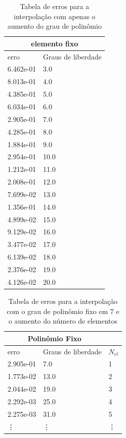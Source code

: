 \begin{table}[]
\centering
\caption{Tabela de erros para a interpolação com apenas o aumento do grau de polinômio}
\label{my-label}
\begin{tabular}{|l|l|}
\hline
\multicolumn{2}{|c|}{elemento fixo} \\
\hline
erro        & Graus de liberdade   \\
6.462e-01   & 3.0                  \\
8.013e-01   & 4.0                  \\
4.385e-01   & 5.0                  \\
6.034e-01   & 6.0                  \\
2.905e-01   & 7.0                  \\
4.285e-01   & 8.0                  \\
1.884e-01   & 9.0                  \\
2.954e-01   & 10.0                 \\
1.212e-01   & 11.0                 \\
2.008e-01   & 12.0                 \\
7.699e-02   & 13.0                 \\
1.356e-01   & 14.0                 \\
4.899e-02   & 15.0                 \\
9.129e-02   & 16.0                 \\
3.477e-02   & 17.0                 \\
6.139e-02   & 18.0                 \\
2.376e-02   & 19.0                 \\
4.126e-02   & 20.0                \\
\hline
\end{tabular}
\end{table}

\begin{table}[]
\centering
\caption{Tabela de erros para a interpolação com o grau de polinômio fixo em 7 e o aumento do número de elementos}
\label{my-label}
\begin{tabular}{|l|l|l|}
\hline
\multicolumn{2}{|c|}{Polinômio Fixo} &           \\
\hline
erro         & Graus de liberdade    & $N_{el}$ \\
2.905e-01    & 7.0                 & 1         \\
1.773e-02    & 13.0                & 2         \\
2.044e-02    & 19.0                & 3         \\
2.292e-03    & 25.0                & 4         \\
2.275e-03    & 31.0                & 5        \\
\vdots       &  \vdots             & \vdots   \\
\hline
\end{tabular}
\end{table}

